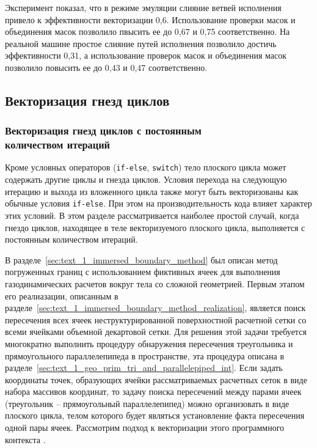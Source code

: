 Эксперимент показал, что в режиме эмуляции слияние ветвей исполнения привело к эффективности векторизации 0,6.
Использование проверки масок и объединения масок позволило пвысить ее до 0,67 и 0,75 соответственно.
На реальной машине простое слияние путей исполнения позволило достичь эффективности 0,31, а использование проверок масок и объединения масок позволило повысить ее до 0,43 и 0,47 соответственно.


\subsection{Векторизация гнезд циклов}

\subsubsection{Векторизация гнезд циклов с постоянным \\ количеством итераций}\label{sec:text_4_vec_mesh_intersect}

Кроме условных операторов (\texttt{if-else}, \texttt{switch}) тело плоского цикла\label{term:flat_loop4} может содержать другие циклы и гнезда циклов.
Условия перехода на следующую итерацию и выхода из вложенного цикла также могут быть векторизованы как обычные условия \texttt{if-else}.
При этом на производительность кода влияет характер этих условий.
В этом разделе рассматривается наиболее простой случай, когда гнездо циклов, находящее в теле векторизуемого плоского цикла, выполняется с постоянным количеством итераций.

В разделе~\ref{sec:text_1_immersed_boundary_method} был описан метод погруженных границ\label{term:immersed_boundary_method2} с использованием фиктивных ячеек\label{term:cell_ibm_ghost3} для выполнения газодинамических расчетов вокруг тела со сложной геометрией.
Первым этапом его реалиазации, описанным в разделе~\ref{sec:text_1_immersed_boundary_method_realization}, является поиск пересечения всех ячеек неструктурированной поверхностной расчетной сетки\label{term:unstruct_surf_calc_mesh2} со всеми ячейками объемной декартовой сетки\label{term:mesh_descartes2}.
Для решения этой задачи требуется многократно выполнить процедуру обнаружения пересечения треугольника и прямоугольного параллелепипеда в пространстве, эта процедура описана в разделе~\ref{sec:text_1_geo_prim_tri_and_parallelepiped_int}.
Если задать координаты точек, образующих ячейки рассматриваемых расчетных сеток в виде набора массивов координат, то задачу поиска пересечений между парами ячеек (треугольник -- прямоугольный параллелепипед) можно организовать в виде плоского цикла, телом которого будет являться установление факта пересечения одной пары ячеек.
Рассмотрим подход к векторизации этого программного контекста \cite{Rybakov2019VecInt}.

